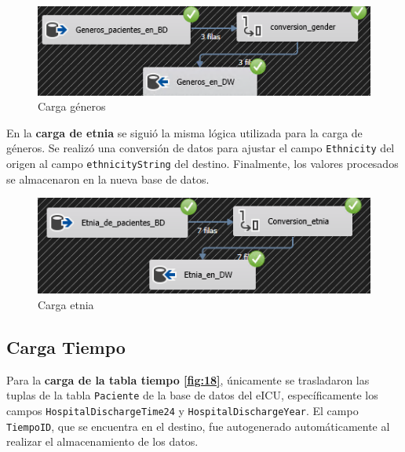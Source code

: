 \documentclass[12pt, a4paper, twoside]{article}
\begin{document}
	\begin{figure}[H]
		\centering
		\includegraphics[width=1\textwidth]{image/106_carga_generos.png}
		\caption{Carga géneros}
		\label{fig:10}
	\end{figure}
	
	En la \textbf{carga de etnia} se siguió la misma lógica utilizada para la carga de géneros. Se realizó una conversión de datos para ajustar el campo \texttt{Ethnicity} del origen al campo \texttt{ethnicityString} del destino. Finalmente, los valores procesados se almacenaron en la nueva base de datos.
	
	\begin{figure}[H]
		\centering
		\includegraphics[width=1\textwidth]{image/107_carga_etnia.png}
		\caption{Carga etnia}
		\label{fig:11}
	\end{figure}
	
	
	\subsection{Carga Tiempo}
	
	Para la \textbf{carga de la tabla tiempo \ref{fig:18}}, únicamente se trasladaron las tuplas de la tabla \texttt{Paciente} de la base de datos del eICU, específicamente los campos \texttt{HospitalDischargeTime24} y \texttt{HospitalDischargeYear}. El campo \texttt{TiempoID}, que se encuentra en el destino, fue autogenerado automáticamente al realizar el almacenamiento de los datos.
	
\end{document}
